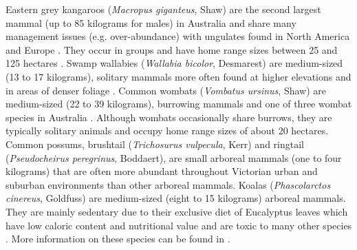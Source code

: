 Eastern grey kangaroos (\textit{Macropus giganteus}, Shaw) are the second largest mammal (up to 85 kilograms for males) in Australia and share many management issues (e.g. over-abundance) with ungulates found in North America and Europe \citep{crof04,coul10}. They occur in groups and have home range sizes between 25 and 125 hectares \citep{daws12}.  Swamp wallabies (\textit{Wallabia bicolor}, Desmarest) are medium-sized (13 to 17 kilograms), solitary mammals more often found at higher elevations and in areas of denser foliage \citep{vand08}. Common wombats (\textit{Vombatus ursinus}, Shaw) are medium-sized (22 to 39 kilograms), burrowing mammals and one of three wombat species in Australia \citep{vand08}. Although wombats occasionally share burrows, they are typically solitary animals and occupy home range sizes of about 20 hectares. Common possums, brushtail (\textit{Trichosurus vulpecula}, Kerr) and ringtail (\textit{Pseudocheirus peregrinus}, Boddaert), are small arboreal mammals (one to four kilograms) that are often more abundant throughout Victorian urban and suburban environments than other arboreal mammals.  Koalas (\textit{Phascolarctos cinereus}, Goldfuss) are medium-sized (eight to 15 kilograms) arboreal mammals.  They are mainly sedentary due to their exclusive diet of Eucalyptus leaves which have low caloric content and nutritional value and are toxic to many other species \citep{vand08}. More information on these species can be found in .

